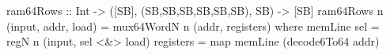 \begin{haskellcode}
    ram64Rows :: Int -> ([SB], (SB,SB,SB,SB,SB,SB), SB) -> [SB]
    ram64Rows n (input, addr, load) = mux64WordN n (addr, registers)
        where
            memLine sel = regN n (input, sel <&> load)
            registers   = map memLine (decode6To64 addr)
\end{haskellcode}
